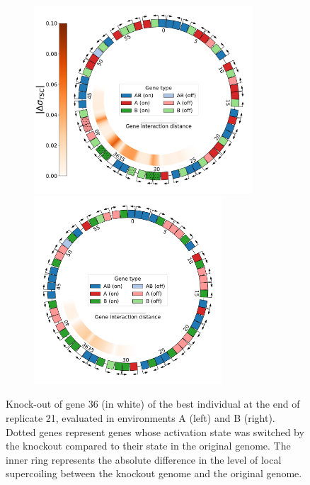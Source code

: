 \begin{figure}[H]
  \centering
  \begin{subfigure}[t]{\textwidth}
    \centering
    \includegraphics[height=7cm]{ploscb/img/ko_genome_and_tsc_env_A_gene_36.pdf}
    \hspace{-0.5cm}
    \includegraphics[height=7cm]{ploscb/img/ko_genome_and_tsc_env_B_gene_36.pdf}
  \end{subfigure}
  \caption{Knock-out of gene 36 (in white) of the best individual at the end of replicate 21, evaluated in environments A (left) and B (right).
  Dotted genes represent genes whose activation state was switched by the knockout compared to their state in the original genome.
  The inner ring represents the absolute difference in the level of local supercoiling between the knockout genome and the original genome.}
  \label{fig:ko_genomes}
\end{figure}

